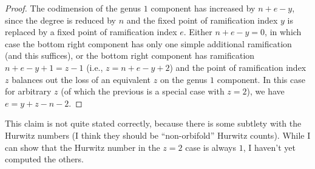 \documentclass[11pt]{article}           %
\theoremstyle{definition}
\theoremstyle{definition}
\begin{document}
\begin{proof}
\begin{tikzpicture}
 \end{tikzpicture}

        The codimension of the genus $1$ component has increased by
        $n+e-y$, since the degree is reduced by $n$ and the fixed point
        of ramification index $y$ is replaced by a fixed point of ramification
        index $e$. Either $n+e-y=0$, in which case the bottom right component
        has only one simple additional ramification (and this suffices), or
        the bottom right component has ramification $n+e-y+1=z-1$
        (i.e., $z=n+e-y+2$) and the point of ramification index $z$ balances
        out the loss of an equivalent $z$ on the genus $1$ component. In this
        case for arbitrary $z$ (of which the previous is a special case with $z=2$),
        we have $e=y+z-n-2$.
        
\end{proof}

This claim is not quite stated correctly, because there is some subtlety with
the Hurwitz numbers (I think they should be ``non-orbifold'' Hurwitz counts).
While I can show that the Hurwitz number in the $z=2$ case is always $1$, I haven't
yet computed the others.
\end{document}
